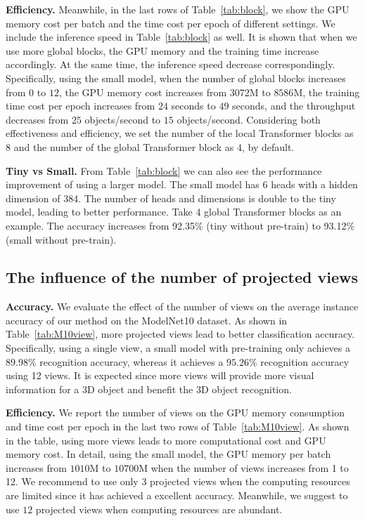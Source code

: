 \documentclass{bmvc2k}
\begin{document}
\noindent \textbf{Efficiency.} Meanwhile, in the last rows of Table~\ref{tab:block}, we show the GPU memory cost per batch and the time cost per epoch of different settings. We include the inference speed in Table~\ref{tab:block} as well. It is shown that when we use more global blocks, the GPU memory and the training time increase accordingly. At the same time, the inference speed decrease correspondingly. Specifically, using the small model, when the number of global blocks increases from $0$ to $12$, the GPU memory cost increases from $3072$M to $8586$M, the training time cost per epoch increases from $24$ seconds to $49$ seconds, and the throughput decreases from $25$ objects/second to $15$ objects/second.
Considering both effectiveness and efficiency, we set the number of the local Transformer blocks as $8$ and the number of the global Transformer block as $4$, by default.

\vspace{0.1in}
\noindent \textbf{Tiny vs Small.} From Table~\ref{tab:block} we can also see the performance improvement of using a larger model. The small model has 6 heads with a hidden dimension of 384. The number of heads and dimensions is double to the tiny model, leading to better performance. Take 4 global Transformer blocks as an example. The accuracy increases from 92.35\% (tiny without pre-train) to 93.12\% (small without pre-train).

\subsection{The influence of the number of projected views}
\textbf{Accuracy.} We evaluate the effect of the number of views on the average instance accuracy of our method on the ModelNet10 dataset.
As shown in Table~\ref{tab:M10view}, more projected views lead to better classification accuracy. 
Specifically, using a single view, a small model with pre-training only achieves a $89.98\%$ recognition accuracy, whereas it achieves a $95.26\%$ recognition accuracy using 12 views. 
It is expected since more views will provide more visual information for a 3D object and benefit the 3D object recognition. 


\vspace{0.1in}
\noindent \textbf{Efficiency.} We report the number of views on the GPU memory consumption and time cost per epoch in the last two rows of Table~\ref{tab:M10view}. As shown in the table,  using more views leads to  more computational cost and GPU memory cost. In detail, using the small model, the GPU memory per batch increases from $1010$M to $10700$M when the number of views increases from 1 to 12. We recommend to use only $3$ projected views when the computing resources are limited since it has achieved a excellent accuracy. Meanwhile, we suggest to use $12$ projected  views when computing resources are abundant.
\end{document}
